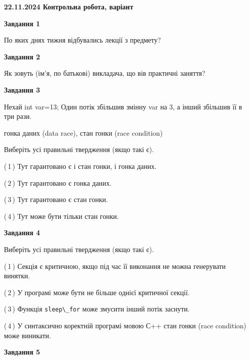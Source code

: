 \documentclass[12pt, ukrainian]{article}
\def\code#1{\Verb!#1!}
\begin{document}
\begin {large}

\textbf{22.11.2024 Контрольна робота, варіант  }\par


{

\begin{center}
\textbf{Завдання 1}
\end{center}

По яких днях тижня відбувались лекції з предмету?


\begin{center}
\textbf{Завдання 2}
\end{center}

Як зовуть (ім'я, по батькові) викладача, що вів практичні заняття?


\begin{center}
\textbf{Завдання 3}
\end{center}

Нехай int var=13; Один потік збільшив змінну var на 3, а інший збільшив її в три рази.

гонка даних (data race), стан гонки (race condition)

Виберіть усі правильні твердження (якщо такі є).\par
\vspace{2mm}
(\,1\,) Тут гарантовано є і стан гонки, і гонка даних.%

(\,2\,) Тут гарантовано є гонка даних.%

(\,3\,) Тут гарантовано є стан гонки.%

(\,4\,) Тут може бути тільки стан гонки.%


\begin{center}
\textbf{Завдання 4}
\end{center}

Виберіть усі правильні твердження (якщо такі є).\par
\vspace{2mm}

(\,1\,) Секція є критичною, якщо під час її виконання не можна генерувати винятки.%

(\,2\,) У програмі може бути не більше однієї критичної секції.%

(\,3\,) Функція \code{sleep\_for} може змусити інший потік заснути.%

(\,4\,) У синтаксично коректній програмі мовою С++ стан гонки (race condition) може виникати.%


\begin{center}
\textbf{Завдання 5}
\end{center}

}
\end{large}
\end{document}

